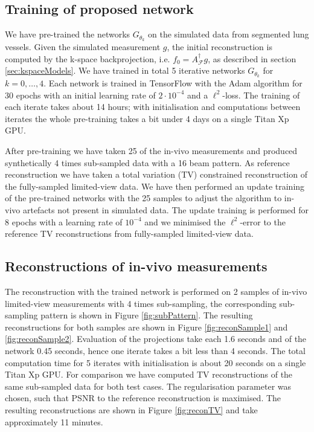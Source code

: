 \documentclass[runningheads]{llncs}
\begin{document}
\subsection{Training of proposed network}
We have pre-trained the networks $G_{\theta_k}$ on the simulated data 
from segmented lung vessels. Given the simulated measurement $g$, the 
initial reconstruction is computed by the k-space backprojection, i.e. $f_0=A^\dagger_\mathcal{F}g$, as described in section \ref{sec:kspaceModels}. 
We have trained in total 5 iterative networks $G_{\theta_k}$ for $k=0,\dots,4$. Each network is trained in TensorFlow with the Adam 
algorithm for 30 epochs with an initial learning rate of $2\cdot 10^{-4}$ and a $\ell^2$-loss. The training of each iterate takes about 
14 hours; with initialisation and computations between iterates the whole pre-training takes a bit under 4 days on a single Titan Xp GPU.

After pre-training we have taken 25 of the in-vivo measurements and 
produced synthetically 4 times sub-sampled data with a 16 beam pattern. 
As reference reconstruction we have taken a total variation (TV) 
constrained reconstruction of the fully-sampled limited-view data. We 
have then performed an update training of the pre-trained networks with 
the 25 samples to adjust the algorithm to in-vivo artefacts not present 
in simulated data. The update training is performed for 8 epochs with a 
learning rate of $10^{-4}$ and we minimised the $\ell^2$-error to the 
reference TV reconstructions from fully-sampled limited-view data.

\vspace{-0.5em}
\subsection{Reconstructions of in-vivo measurements}
The reconstruction with the trained network is performed on 2 samples of in-vivo limited-view measurements with 4 times sub-sampling, the corresponding sub-sampling pattern is shown in Figure \ref{fig:subPattern}. The resulting reconstructions for both samples are shown in Figure \ref{fig:reconSample1} and \ref{fig:reconSample2}. Evaluation of the projections take each 1.6 seconds and of the network 0.45 seconds, hence one iterate takes a bit less than 4 seconds. The total computation time for 5 iterates with initialisation is about 20 seconds on a single Titan Xp GPU.  
For comparison we have computed TV reconstructions of the same sub-sampled data for both test cases. The regularisation parameter was chosen, such that PSNR to the reference reconstruction is maximised. The resulting reconstructions are shown in Figure \ref{fig:reconTV} and take approximately 11 minutes.
\end{document}
